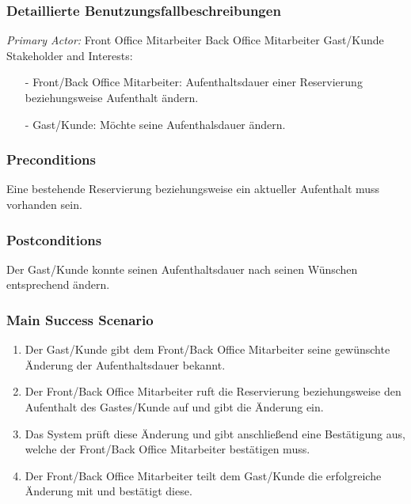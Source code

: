 \documentclass[./detailed_overview_usecases.tex]{subfiles}
\begin{document}
    \subsubsection{Detaillierte Benutzungsfallbeschreibungen}
    \textit{Primary Actor:}
    Front Office Mitarbeiter
	Back Office Mitarbeiter
	Gast/Kunde
    \\
    Stakeholder and Interests:
    \begin{itemize}
        \item[-] Front/Back Office Mitarbeiter: Aufenthaltsdauer einer Reservierung beziehungsweise Aufenthalt ändern.
        \item[-] Gast/Kunde: Möchte seine Aufenthalsdauer ändern.
    \end{itemize}

    \subsubsection*{Preconditions}
	Eine bestehende Reservierung beziehungsweise ein aktueller Aufenthalt muss vorhanden sein.
	
    \subsubsection*{Postconditions}
    Der Gast/Kunde konnte seinen Aufenthaltsdauer nach seinen Wünschen entsprechend ändern.
	
    \subsubsection*{Main Success Scenario}
    \begin{enumerate}
        \item Der Gast/Kunde gibt dem Front/Back Office Mitarbeiter seine gewünschte Änderung der Aufenthaltsdauer bekannt.
        \item Der Front/Back Office Mitarbeiter ruft die Reservierung beziehungsweise den Aufenthalt des Gastes/Kunde auf und gibt die Änderung ein.
	    \item Das System prüft diese Änderung und gibt anschließend eine Bestätigung aus, welche der Front/Back Office Mitarbeiter bestätigen muss.
	    \item Der Front/Back Office Mitarbeiter teilt dem Gast/Kunde die erfolgreiche Änderung mit und bestätigt diese.
    \end{enumerate}
\end{document}

